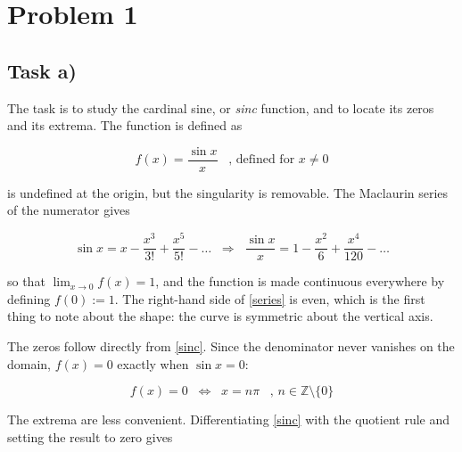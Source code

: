 
\section*{Problem 1}
{}   %

\subsection*{Task a)}
{}

The task is to study the cardinal sine, or \emph{sinc} function, and to locate
its zeros and its extrema. The function is defined as

\begin{equation} \label{sinc}
	f(x) = \frac{\sin x}{x} \; \; \; \text{, defined for } x \neq 0
\end{equation}

 is undefined at the origin, but the singularity is removable. The
Maclaurin series of the numerator gives

\begin{equation} \label{series}
	\sin x = x - \frac{x^3}{3!} + \frac{x^5}{5!} - \dots
	\; \; \Rightarrow \; \;
	\frac{\sin x}{x} = 1 - \frac{x^2}{6} + \frac{x^4}{120} - \dots
\end{equation}

so that $\displaystyle\lim_{x \to 0} f(x) = 1$, and the function is made
continuous everywhere by defining $f(0) := 1$. The right-hand side of
\cref{series} is even, which is the first thing to note about the shape: the
curve is symmetric about the vertical axis.

The zeros follow directly from \cref{sinc}. Since the denominator never
vanishes on the domain, $f(x) = 0$ exactly when $\sin x = 0$:

\begin{equation} \label{zeros}
	f(x) = 0 \; \; \Leftrightarrow \; \; x = n\pi \; \; \; \text{, } n \in \mathbb{Z} \setminus \{0\}
\end{equation}

The extrema are less convenient. Differentiating \cref{sinc} with the quotient
rule and setting the result to zero gives

